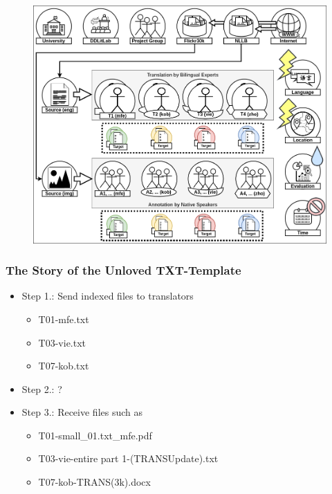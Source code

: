 \documentclass[aspectratio=169]{beamer}
\begin{document}
\begin{frame}[fragile]
\begin{minipage}{.50\textwidth}
\begin{figure}
            \includegraphics[width=1.0\textwidth]{images/MTACR-Overview.png} 
        \end{figure}
    \end{minipage}
\end{frame}

\begin{frame}[fragile]
	\frametitle{The Story of the Unloved TXT-Template}
    \centering
    \large
    \begin{itemize}
        \item Step 1.: Send indexed files to translators
        \begin{itemize}
            \item T01-mfe.txt
            \item T03-vie.txt
            \item T07-kob.txt
        \end{itemize}
        \item Step 2.: ?
        \item Step 3.: Receive files such as
        \begin{itemize}
            \item T01-small\_01.txt\_mfe.pdf
            \item T03-vie-entire part 1-(TRANSUpdate).txt
            \item T07-kob-TRANS(3k).docx
        \end{itemize}
    \end{itemize}
\end{frame}
\end{document}
